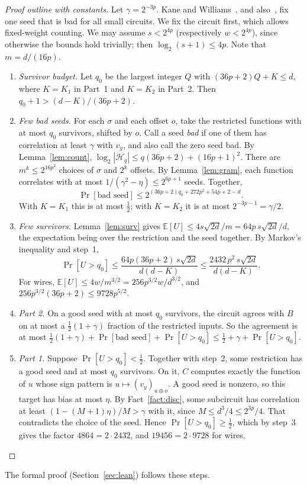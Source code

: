 \documentclass[11pt,letterpaper]{article}
\theoremstyle{remark}
\newcommand{\cH}{\mathcal H}
\begin{document}
\begin{proof}[Proof outline with constants]
Let $\gamma=2^{-3p}$. Kane and Williams~\cite[Cor.~6.2]{KW}, and
also~\cite{CSS,KKL}, fix one seed that is bad for all small circuits. We fix the
circuit first, which allows fixed-weight counting. We may assume $s<2^{4p}$
(respectively $w<2^{4p}$), since otherwise the bounds hold trivially; then
$\log_2(s+1)\le4p$. Note that $m=d/(16p)$.
\begin{enumerate}
\item \emph{Survivor budget.} Let $q_0$ be the largest integer $Q$ with
      $(36p+2)Q+K\le d$, where $K=K_1$ in Part~1 and $K=K_2$ in Part~2. Then
      $q_0+1>(d-K)/(36p+2)$.
\item \emph{Few bad seeds.} For each $\sigma$ and each offset $o$, take the
      restricted functions with at most $q_0$ survivors, shifted by $o$. Call a
      seed \emph{bad} if one of them has correlation at least $\gamma$ with
      $v_y$, and also call the zero seed bad. By Lemma~\ref{lem:count},
      $\log_2|\cH_q|\le q(36p+2)+(16p+1)^2$. There are $m^k\le2^{16p^2}$
      choices of $\sigma$ and $2^k$ offsets. By Lemma~\ref{lem:gram}, each
      function correlates with at most $1/(\gamma^2-\eta)\le2^{6p+1}$ seeds.
      Together,
      \[
      \Pr[\text{bad seed}]\le2^{(36p+2)q_0+272p^2+54p+2-d}.
      \]
      With $K=K_1$ this is at most $\tfrac12$; with $K=K_2$ it is at most
      $2^{-3p-1}=\gamma/2$.
\item \emph{Few survivors.} Lemma~\ref{lem:surv} gives
      $\mathbb E[U]\le4s\sqrt{2d}/m=64p\,s\sqrt{2d}/d$, the expectation being
      over the restriction and the seed together. By Markov's inequality and
      step~1,
      \[
      \Pr[U>q_0]\le\frac{64p(36p+2)\,s\sqrt{2d}}{d(d-K)}
      \le\frac{2432\,p^2\,s\sqrt{2d}}{d(d-K)} .
      \]
      For wires, $\mathbb E[U]\le4w/m^{3/2}=256p^{3/2}w/d^{3/2}$, and
      $256p^{3/2}(36p+2)\le9728p^{5/2}$.
\item \emph{Part 2.} On a good seed with at most $q_0$ survivors, the circuit
      agrees with $B$ on at most a $\tfrac12(1+\gamma)$ fraction of the
      restricted inputs. So the agreement is at most
      $\tfrac12(1+\gamma)+\Pr[\text{bad seed}]+\Pr[U>q_0]\le\tfrac12+\gamma+\Pr[U>q_0]$.
\item \emph{Part 1.} Suppose $\Pr[U>q_0]<\tfrac12$. Together with step~2, some
      restriction has a good seed and at most $q_0$ survivors. On it, $C$
      computes exactly the function of $u$ whose sign pattern is
      $u\mapsto(v_y)_{u\oplus o}$. A good seed is nonzero, so this target has
      bias at most $\eta$. By
      Fact~\ref{fact:disc}, some subcircuit has correlation at least
      $(1-(M+1)\eta)/M>\gamma$ with it, since $M\le d^3/4\le2^{3p}/4$. That
      contradicts the choice of the seed. Hence $\Pr[U>q_0]\ge\tfrac12$, which
      by step~3 gives the factor $4864=2\cdot2432$, and $19456=2\cdot9728$ for
      wires.\qedhere
\end{enumerate}
\end{proof}
The formal proof (Section~\ref{sec:lean}) follows these steps.
\end{document}
